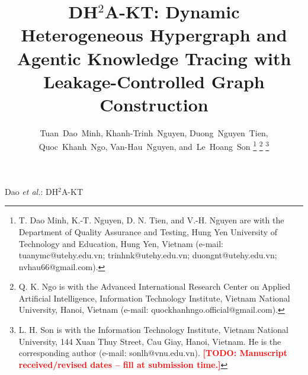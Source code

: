 \documentclass[journal]{IEEEtran}
\newcommand{\todo}[1]{\textcolor{red}{\textbf{[TODO: #1]}}}
\begin{document}
\title{DH$^2$A-KT: Dynamic Heterogeneous Hypergraph and Agentic Knowledge
Tracing with Leakage-Controlled Graph Construction}

\author{Tuan~Dao~Minh, Khanh-Trinh~Nguyen, Duong~Nguyen~Tien, Quoc~Khanh~Ngo,
Van-Hau~Nguyen, and~Le~Hoang~Son
\thanks{T. Dao Minh, K.-T. Nguyen, D. N. Tien, and V.-H. Nguyen are with the
Department of Quality Assurance and Testing, Hung Yen University of
Technology and Education, Hung Yen, Vietnam (e-mail: tuanymc@utehy.edu.vn;
trinhnk@utehy.edu.vn; duongnt@utehy.edu.vn; nvhau66@gmail.com).}
\thanks{Q. K. Ngo is with the Advanced International Research Center on
Applied Artificial Intelligence, Information Technology Institute, Vietnam
National University, Hanoi, Vietnam (e-mail: quockhanhngo.official@gmail.com).}
\thanks{L. H. Son is with the Information Technology Institute, Vietnam
National University, 144 Xuan Thuy Street, Cau Giay, Hanoi, Vietnam. He is
the corresponding author (e-mail: sonlh@vnu.edu.vn).
\todo{Manuscript received/revised dates -- fill at submission time.}}}

%
{Dao \MakeLowercase{\textit{et al.}}: DH$^2$A-KT}

\maketitle
\end{document}
